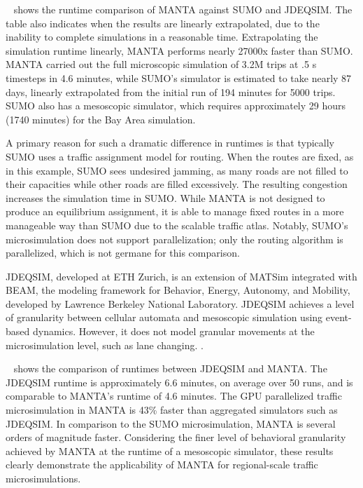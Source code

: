 \documentclass[final]{IEEEtran}
\begin{document}
~ shows the runtime comparison of MANTA against SUMO and JDEQSIM. The table also indicates when the results are linearly extrapolated, due to the inability to complete simulations in a reasonable time. Extrapolating the simulation runtime linearly, MANTA performs nearly 27000x faster than SUMO. MANTA carried out the full microscopic simulation of 3.2M trips at .5 s timesteps in 4.6 minutes, while SUMO's simulator is estimated to take nearly 87 days, linearly extrapolated from the initial run of 194 minutes for 5000 trips. SUMO also has a mesoscopic simulator, which requires approximately 29 hours (1740 minutes) for the Bay Area simulation.


A primary reason for such a dramatic difference in runtimes is that typically SUMO uses a traffic assignment model for routing. When the routes are fixed, as in this example, SUMO sees undesired jamming, as many roads are not filled to their capacities while other roads are filled excessively. The resulting congestion increases the simulation time in SUMO. While MANTA is not designed to produce an equilibrium assignment, it is able to manage fixed routes in a more manageable way than SUMO due to the scalable traffic atlas. Notably, SUMO's microsimulation does not support parallelization; only the routing algorithm is parallelized, which is not germane for this comparison.

JDEQSIM, developed at ETH Zurich, is an extension of MATSim integrated with BEAM, the modeling framework for Behavior, Energy, Autonomy, and Mobility, developed by Lawrence Berkeley National Laboratory. JDEQSIM achieves a level of granularity between cellular automata and mesoscopic simulation using event-based dynamics. However, it does not model granular movements at the microsimulation level, such as lane changing. \cite{waraichPerformanceImprovementsLargeScale2015}. 

~ shows the comparison of runtimes between JDEQSIM and MANTA. The JDEQSIM runtime is approximately 6.6 minutes, on average over 50 runs, and is comparable to MANTA's runtime of 4.6 minutes. The GPU parallelized traffic microsimulation in MANTA is 43\% faster than aggregated simulators such as JDEQSIM. In comparison to the SUMO microsimulation, MANTA is several orders of magnitude faster. Considering the finer level of behavioral granularity achieved by MANTA at the runtime of a mesoscopic simulator, these results clearly demonstrate the applicability of MANTA for regional-scale traffic microsimulations.
\end{document}
